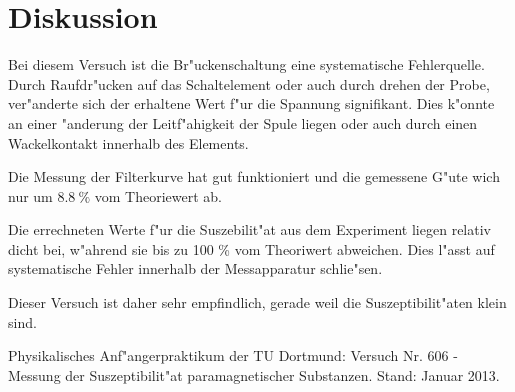 \section{Diskussion}
	\label{diskussion}

	Bei diesem Versuch ist die Br"uckenschaltung eine systematische Fehlerquelle.
	Durch Raufdr"ucken auf das Schaltelement oder auch durch drehen der Probe, ver"anderte sich der erhaltene Wert f"ur die Spannung signifikant.
	Dies k"onnte an einer "anderung der Leitf"ahigkeit der Spule liegen oder auch durch einen Wackelkontakt innerhalb des Elements.

	Die Messung der Filterkurve hat gut funktioniert und die gemessene G"ute wich nur um $\SI{8.8}{\%}$ vom Theoriewert ab.

	Die errechneten Werte f"ur die Suszebilit"at aus dem Experiment liegen relativ dicht bei, w"ahrend sie bis zu 100 \% vom Theoriwert abweichen.
	Dies l"asst auf systematische Fehler innerhalb der Messapparatur schlie"sen.

	Dieser Versuch ist daher sehr empfindlich, gerade weil die Suszeptibilit"aten klein sind.


\begin{thebibliography}{9}
	 Physikalisches Anf"angerpraktikum der TU Dortmund: Versuch Nr. 606 - Messung der Suszeptibilit"at paramagnetischer Substanzen. Stand: Januar 2013.

\end{thebibliography}
